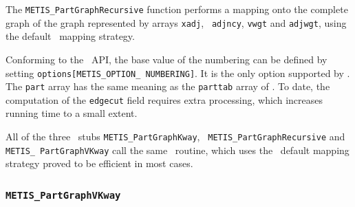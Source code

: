 \begin{itemize}
\progdes

The {\tt METIS\_PartGraphRecursive} function performs a mapping onto
the complete graph of the graph represented by arrays {\tt xadj}, {\tt
adjncy}, {\tt vwgt} and {\tt adjwgt}, using the default \scotch\
mapping strategy.

Conforming to the \metis\ API, the base value of the numbering
can be defined by setting \texttt{options[METIS\_\lbt OPTION\_\lbt
NUMBERING]}. It is the only option supported by \scotch.
The {\tt part} array has the same meaning as the {\tt parttab} array
of \scotch. To date, the computation of the {\tt edgecut} field
requires extra processing, which increases running time to a small
extent.

All of the three \metis\ stubs
{\tt METIS\_\lbo Part\lbo Graph\lbo Kway}, {\tt
METIS\_\lbo Part\lbo Graph\lbo Recursive} and {\tt METIS\_\lbo
Part\lbo Graph\lbo VKway} call the same \scotch\ routine, which uses
the \scotch\ default mapping strategy proved to be efficient in most
cases.
\end{itemize}

\subsubsection{{\tt METIS\_PartGraphVKway}}

